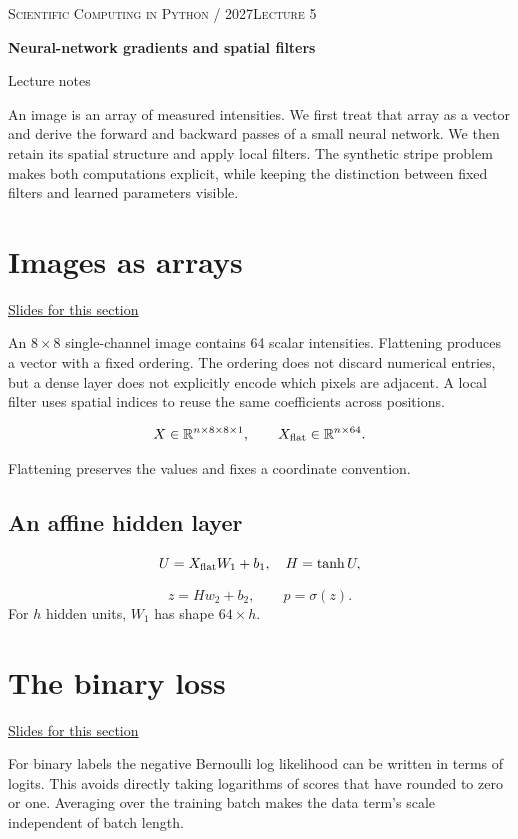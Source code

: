 \documentclass[11pt,letterpaper]{article}
\theoremstyle{definition}\newtheorem{definition}{Definition}\newtheorem{example}{Example}
\numberwithin{equation}{section}
\begin{document}
{\small\scshape Scientific Computing in Python / 2027\hfill Lecture 5}\par\medskip
{\raggedright{}\LARGE\bfseries\color{ink} Neural-network gradients and spatial filters\par}\medskip
{\small Lecture notes}\par\bigskip
An image is an array of measured intensities. We first treat that array as a vector and derive the forward and backward passes of a small neural network. We then retain its spatial structure and apply local filters. The synthetic stripe problem makes both computations explicit, while keeping the distinction between fixed filters and learned parameters visible.

\section{Images as arrays}
\hypertarget{note-images-as-arrays}{}\label{note:images-as-arrays}
{\small \href{slides.html\#frame=images-as-arrays\&step=1}{Slides for this section}}\par
An $8\times8$ single-channel image contains 64 scalar intensities. Flattening produces a vector with a fixed ordering. The ordering does not discard numerical entries, but a dense layer does not explicitly encode which pixels are adjacent. A local filter uses spatial indices to reuse the same coefficients across positions.

\[
X\in\mathbb{R}^{n\times8\times8\times1},\qquad
X_{\rm flat}\in\mathbb{R}^{n\times64}.
\]

Flattening preserves the values and fixes a coordinate convention.

\subsection*{An affine hidden layer}
\[
U=X_{\rm flat}W_1+b_1,\quad H=\tanh U,
\]

\[
z=Hw_2+b_2,\qquad p=\sigma(z).
\]
For $h$ hidden units, $W_1$ has shape $64\times h$.
\section{The binary loss}
\hypertarget{note-the-binary-loss}{}\label{note:the-binary-loss}
{\small \href{slides.html\#frame=the-binary-loss\&step=1}{Slides for this section}}\par
For binary labels the negative Bernoulli log likelihood can be written in terms of logits. This avoids directly taking logarithms of scores that have rounded to zero or one. Averaging over the training batch makes the data term's scale independent of batch length.
\end{document}
